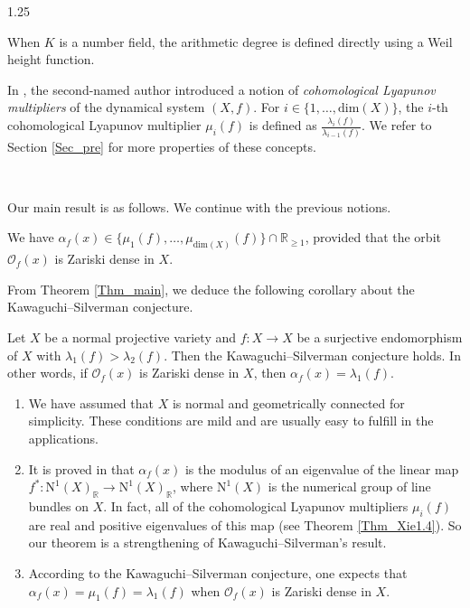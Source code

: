 \documentclass[12pt]{amsart}
\newcommand\mO{\mathcal{O}}
\newcommand\ra{\rightarrow}
\begin{document}
\begin{spacing}{1.25}
\begin{remark}
When $K$ is a number field, the arithmetic degree is defined directly using a Weil height function.
\end{remark}

In \cite{xie24}, the second-named author introduced a notion of \emph{cohomological Lyapunov multipliers} of the dynamical system $(X,f)$. For $i\in\{1,\dots,\mathrm{dim}(X)\}$, the $i$-th cohomological Lyapunov multiplier $\mu_i(f)$ is defined as $\frac{\lambda_i(f)}{\lambda_{i-1}(f)}$. We refer to Section \ref{Sec_pre} for more properties of these concepts.

\ 

Our main result is as follows. We continue with the previous notions.

\begin{theorem}\label{Thm_main}
We have $\alpha_f(x)\in\{\mu_1(f),\dots,\mu_{\mathrm{dim}(X)}(f)\}\cap\mathbb{R}_{\geq1}$, provided that the orbit $\mathcal{O}_f(x)$ is Zariski dense in $X$.
\end{theorem}

From Theorem \ref{Thm_main}, we deduce the following corollary about the Kawaguchi--Silverman conjecture.

\begin{corollary}
Let $X$ be a normal projective variety and $f:X\ra X$ be a surjective endomorphism of $X$ with $\lambda_1(f)>\lambda_2(f)$. Then the Kawaguchi--Silverman conjecture holds. In other words, if $\mO_f(x)$ is Zariski dense in $X$, then $\alpha_f(x)=\lambda_1(f)$. 
\end{corollary}

\begin{remark}
\begin{enumerate}
\item
We have assumed that $X$ is normal and geometrically connected for simplicity. These conditions are mild and are usually easy to fulfill in the applications.

\item
It is proved in \cite{KS16} that $\alpha_f(x)$ is the modulus of an eigenvalue of the linear map $f^*:\mathrm{N}^1(X)_{\mathbb{R}}\rightarrow\mathrm{N}^1(X)_{\mathbb{R}}$, where $\mathrm{N}^1(X)$ is the numerical group of line bundles on $X$. In fact, all of the cohomological Lyapunov multipliers $\mu_i(f)$ are real and positive eigenvalues of this map (see Theorem \ref{Thm_Xie1.4}). So our theorem is a strengthening of Kawaguchi--Silverman's result.

\item According to the Kawaguchi--Silverman conjecture, one expects that $\alpha_f(x)=\mu_1(f)=\lambda_1(f)$ when $\mO_f(x)$ is Zariski dense in $X$.
\end{enumerate}
\end{remark}


\end{spacing}
\end{document}
